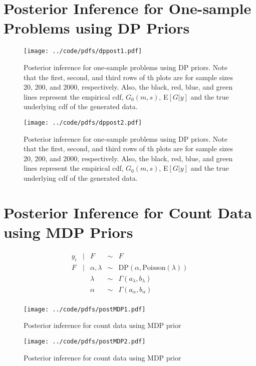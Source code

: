 \documentclass{article}
\def\beginmyfig{\begin{figure}[htbp]\begin{center}}
\def\endmyfig{\end{center}\end{figure}}
\begin{document}
\newpage
\section{Posterior Inference for One-sample Problems using DP Priors}
\beginmyfig
  \texttt{[image: ../code/pdfs/dppost1.pdf]}
  \caption{Posterior inference for one-sample problems using 
  DP priors. Note that the first, second, and third rows of th plots are for
  sample sizes 20, 200, and 2000, respectively.  Also, the black, red, blue, and
  green lines represent the empirical cdf, $G_0(m,s)$, E$[G|y]$ and the true
  underlying cdf of the generated data.}
\endmyfig
\beginmyfig
  \texttt{[image: ../code/pdfs/dppost2.pdf]}
  \caption{Posterior inference for one-sample problems using 
  DP priors. Note that the first, second, and third rows of th plots are for
  sample sizes 20, 200, and 2000, respectively.  Also, the black, red, blue, and
  green lines represent the empirical cdf, $G_0(m,s)$, E$[G|y]$ and the true
  underlying cdf of the generated data.}
\endmyfig


\newpage
\section{Posterior Inference for Count Data using MDP Priors}
\[
  \begin{array}{rclcl}
    y_i &|& F &\sim & F \\
    F &|& \alpha, \lambda &\sim& \text{DP}(\alpha,\text{Poisson}(\lambda)) \\
      && \lambda &\sim& \Gamma(a_\lambda,b_\lambda) \\
      && \alpha &\sim& \Gamma(a_\alpha,b_\alpha) \\
  \end{array}
\]
\beginmyfig
  \texttt{[image: ../code/pdfs/postMDP1.pdf]}
  \caption{Posterior inference for count data using MDP prior}
\endmyfig
\beginmyfig
  \texttt{[image: ../code/pdfs/postMDP2.pdf]}
  \caption{Posterior inference for count data using MDP prior}
\endmyfig
\end{document}
